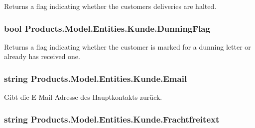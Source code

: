 Returns a flag indicating whether the customer\textquotesingle{}s deliveries are halted. 

\subsubsection[{\texorpdfstring{Dunning\+Flag}{DunningFlag}}]{\setlength{\rightskip}{0pt plus 5cm}bool Products.\+Model.\+Entities.\+Kunde.\+Dunning\+Flag\hspace{0.3cm}{\ttfamily [get]}}\hypertarget{class_products_1_1_model_1_1_entities_1_1_kunde_aa9899cab5b95d9c3849a161343c0ef54}{}\label{class_products_1_1_model_1_1_entities_1_1_kunde_aa9899cab5b95d9c3849a161343c0ef54}


Returns a flag indicating whether the customer is marked for a dunning letter or already has received one. 

\subsubsection[{\texorpdfstring{Email}{Email}}]{\setlength{\rightskip}{0pt plus 5cm}string Products.\+Model.\+Entities.\+Kunde.\+Email\hspace{0.3cm}{\ttfamily [get]}}\hypertarget{class_products_1_1_model_1_1_entities_1_1_kunde_a5db7b37310aeab89c2ab6bb9e4c610e9}{}\label{class_products_1_1_model_1_1_entities_1_1_kunde_a5db7b37310aeab89c2ab6bb9e4c610e9}


Gibt die E-\/\+Mail Adresse des Hauptkontakts zurück. 

\subsubsection[{\texorpdfstring{Frachtfreitext}{Frachtfreitext}}]{\setlength{\rightskip}{0pt plus 5cm}string Products.\+Model.\+Entities.\+Kunde.\+Frachtfreitext\hspace{0.3cm}{\ttfamily [get]}}\hypertarget{class_products_1_1_model_1_1_entities_1_1_kunde_aa301dbde135e024b7222e0515e27d4ef}{}\label{class_products_1_1_model_1_1_entities_1_1_kunde_aa301dbde135e024b7222e0515e27d4ef}


